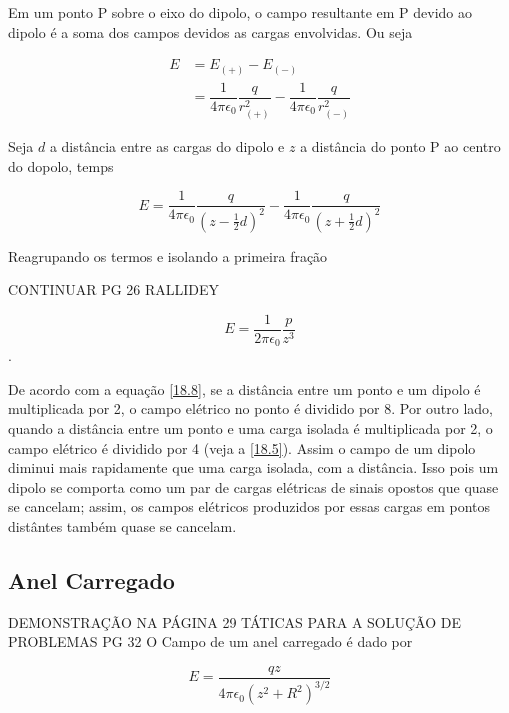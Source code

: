 Em um ponto P sobre o eixo do dipolo, o campo resultante em P devido ao dipolo é a soma dos campos devidos as cargas envolvidas. Ou seja

\begin{equation}\label{18.6}
\begin{split}
    E&=E_{(+)}-E_{(-)}\\
    &=\dfrac{1}{4\pi \epsilon_0} \dfrac{q}{r_{(+)}^2}-\dfrac{1}{4\pi \epsilon_0} \dfrac{q}{r_{(-)}^2}
    \end{split}
\end{equation}

Seja $d$ a distância entre as cargas do dipolo e $z$ a distância do ponto P ao centro do dopolo, temps

\begin{equation}\label{18.7}
     E=\dfrac{1}{4\pi \epsilon_0} \dfrac{q}{(z-\frac{1}{2}d)^2}-\dfrac{1}{4\pi \epsilon_0} \dfrac{q}{(z+\frac{1}{2}d)^2}
\end{equation}

Reagrupando os termos e isolando a primeira fração

CONTINUAR PG 26 RALLIDEY

\begin{equation}\label{18.8}
    E=\dfrac{1}{2\pi \epsilon_0}\dfrac{p}{z^3} 
\end{equation}.

De acordo com a equação \eqref{18.8}, se  a distância entre um ponto e um dipolo é multiplicada por 2, o campo elétrico no ponto é dividido por 8. Por outro lado, quando a distância entre um ponto e uma carga isolada é multiplicada por 2, o campo elétrico é dividido por 4 (veja a \eqref{18.5}). Assim o campo de um dipolo diminui mais rapidamente que uma carga isolada, com a distância. Isso pois um dipolo se comporta como um par de cargas elétricas de sinais opostos que quase se cancelam; assim, os campos elétricos produzidos por essas cargas em pontos distântes também quase se cancelam.

\subsection{Anel Carregado}
DEMONSTRAÇÃO NA PÁGINA 29
TÁTICAS PARA A SOLUÇÃO DE PROBLEMAS PG 32
O Campo de um anel carregado é dado por

\begin{equation}\label{18.9}
    E=\dfrac{qz}{4\pi \epsilon_0 (z^2+R^2)^{3/2}}
\end{equation}

